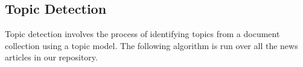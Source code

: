 

\subsection{Topic Detection}
\label{topic detection}



Topic detection involves the process of identifying topics from a document collection using a topic model\cite{blei2012probabilistic}.  
The following algorithm is run over all the news articles in our repository.





